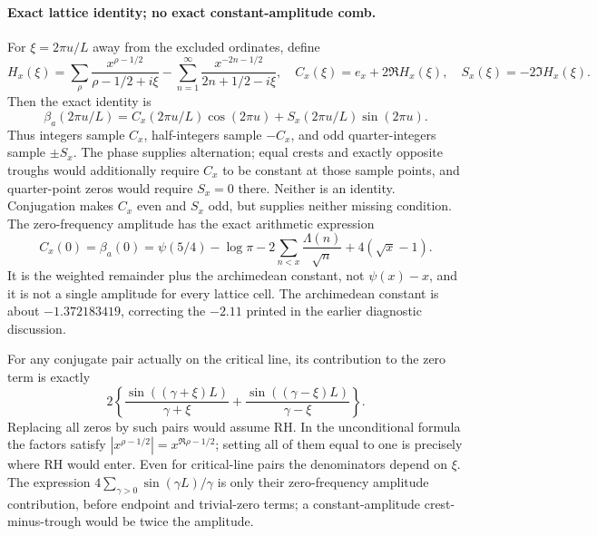 \paragraph{Exact lattice identity; no exact constant-amplitude comb.}
For $\xi=2\pi u/L$ away from the excluded ordinates, define
\[
 H_x(\xi)=\sum_\rho\frac{x^{\rho-1/2}}{\rho-1/2+i\xi}
       -\sum_{n=1}^\infty\frac{x^{-2n-1/2}}{2n+1/2-i\xi},\quad
 C_x(\xi)=e_x+2\Re H_x(\xi),\quad S_x(\xi)=-2\Im H_x(\xi).
\]
Then the exact identity is
\begin{equation}\label{eq:v146-lattice}
 \beta_a(2\pi u/L)=C_x(2\pi u/L)\cos(2\pi u)
                         +S_x(2\pi u/L)\sin(2\pi u).
\end{equation}
Thus integers sample $C_x$, half-integers sample $-C_x$, and odd
quarter-integers sample $\pm S_x$. The phase supplies alternation;
equal crests and exactly opposite troughs would additionally require
$C_x$ to be constant at those sample points, and quarter-point zeros
would require $S_x=0$ there. Neither is an identity. Conjugation makes
$C_x$ even and $S_x$ odd, but supplies neither missing condition.
The zero-frequency amplitude has the exact arithmetic expression
\begin{equation}\label{eq:v146-amplitude}
 C_x(0)=\beta_a(0)=\psi(5/4)-\log\pi
        -2\sum_{n<x}\frac{\Lambda(n)}{\sqrt n}+4(\sqrt x-1).
\end{equation}
It is the weighted remainder plus the archimedean constant, not
$\psi(x)-x$, and it is not a single amplitude for every lattice cell.
The archimedean constant is about $-1.372183419$, correcting the
$-2.11$ printed in the earlier diagnostic discussion.

For any conjugate pair actually on the critical line, its contribution
to the zero term is exactly
\[
 2\left\{\frac{\sin((\gamma+\xi)L)}{\gamma+\xi}
        +\frac{\sin((\gamma-\xi)L)}{\gamma-\xi}\right\}.
\]
Replacing all zeros by such pairs would assume RH. In the unconditional
formula the factors satisfy $|x^{\rho-1/2}|=x^{\Re\rho-1/2}$; setting
all of them equal to one is precisely where RH would enter. Even for
critical-line pairs the denominators depend on $\xi$. The expression
$4\sum_{\gamma>0}\sin(\gamma L)/\gamma$ is only their zero-frequency
amplitude contribution, before endpoint and trivial-zero terms; a
constant-amplitude crest-minus-trough would be twice the amplitude.

